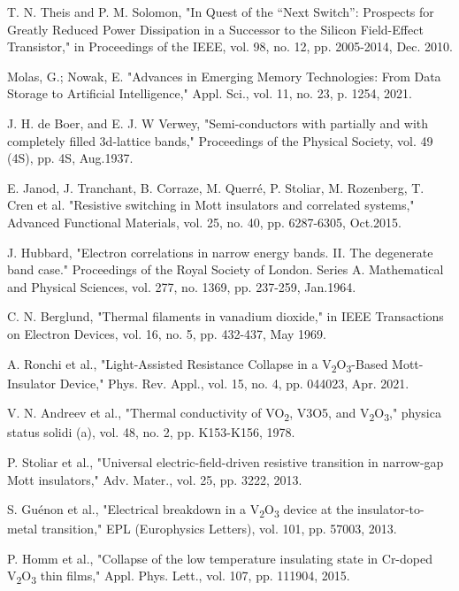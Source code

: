\documentclass[conference]{IEEEtran}
\begin{document}
\begin{thebibliography}{00}

	 T. N. Theis and P. M. Solomon, "In Quest of the “Next Switch”: Prospects for Greatly Reduced Power Dissipation in a Successor to the Silicon Field-Effect Transistor," in Proceedings of the IEEE, vol. 98, no. 12, pp. 2005-2014, Dec. 2010.

	 Molas, G.; Nowak, E. "Advances in Emerging Memory Technologies: From Data Storage to Artificial Intelligence," Appl. Sci., vol. 11, no. 23, p. 1254, 2021.

	 J. H. de Boer, and E. J. W Verwey, "Semi-conductors with partially and with completely filled 3d-lattice bands," Proceedings of the Physical Society, vol. 49 (4S), pp. 4S, Aug.1937.

	 E. Janod, J. Tranchant, B. Corraze, M. Querré, P. Stoliar, M. Rozenberg, T. Cren et al. "Resistive switching in Mott insulators and correlated systems," Advanced Functional Materials, vol. 25, no. 40, pp. 6287-6305, Oct.2015.

	 J. Hubbard, "Electron correlations in narrow energy bands. II. The degenerate band case." Proceedings of the Royal Society of London. Series A. Mathematical and Physical Sciences, vol. 277, no. 1369, pp. 237-259, Jan.1964.

	 C. N. Berglund, "Thermal filaments in vanadium dioxide," in IEEE Transactions on Electron Devices, vol. 16, no. 5, pp. 432-437, May 1969.

	 A. Ronchi et al., "Light-Assisted Resistance Collapse in a V\textsubscript{2}O\textsubscript{3}-Based Mott-Insulator Device," Phys. Rev. Appl., vol. 15, no. 4, pp. 044023, Apr. 2021.

	 V. N. Andreev et al., "Thermal conductivity of VO\textsubscript{2}, V3O5, and V\textsubscript{2}O\textsubscript{3}," physica status solidi (a), vol. 48, no. 2, pp. K153-K156, 1978.

	 P. Stoliar et al., "Universal electric-field-driven resistive transition in narrow-gap Mott insulators," Adv. Mater., vol. 25, pp. 3222, 2013.

	 S. Guénon et al., "Electrical breakdown in a V\textsubscript{2}O\textsubscript{3} device at the insulator-to-metal transition," EPL (Europhysics Letters), vol. 101, pp. 57003, 2013.

	 P. Homm et al., "Collapse of the low temperature insulating state in Cr-doped V\textsubscript{2}O\textsubscript{3} thin films," Appl. Phys. Lett., vol. 107, pp. 111904, 2015.


\end{thebibliography}
\end{document}
